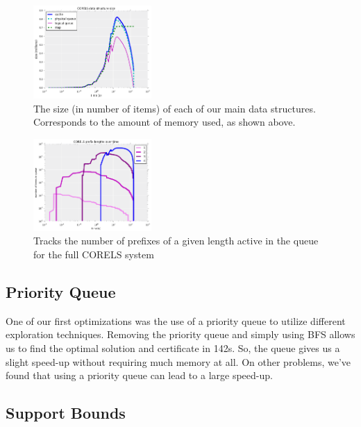 \begin{figure}[t!]
\begin{center}
\includegraphics[width=0.4\textwidth]{figs/corels_size.png}
\end{center}
\caption{The size (in number of items) of each of our main data structures. Corresponds to the amount of memory used, as shown above.}
\label{fig:corels-size}
\end{figure}

\begin{figure}[t!]
\begin{center}
\includegraphics[width=0.4\textwidth]{figs/corels_prefixes.png}
\end{center}
\caption{Tracks the number of prefixes of a given length active in the queue for the full CORELS system}
\label{fig:corels-prefixes}
\end{figure}

\subsection{Priority Queue} \label{exp:priority}

One of our first optimizations was the use of a priority queue to utilize different exploration techniques. 
Removing the priority queue and simply using BFS allows us to find the optimal solution and certificate in 142s.
So, the queue gives us a slight speed-up without requiring much memory at all.
On other problems, we've found that using a priority queue can lead to a large speed-up.

\subsection{Support Bounds}


